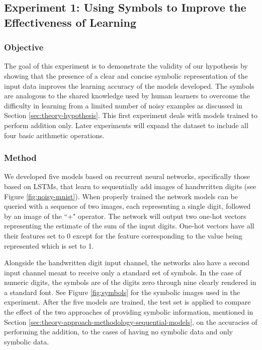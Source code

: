 \subsection{Experiment 1: Using Symbols to Improve the Effectiveness of Learning} \label{sec:experiment-1}

\subsubsection{Objective}

The goal of this experiment is to demonstrate the validity of our hypothesis by showing that the presence of a clear and concise symbolic representation of the input data improves the learning accuracy of the models developed. The symbols are analogous to the shared knowledge used by human learners to overcome the difficulty in learning from a limited number of noisy examples as discussed in Section \ref{sec:theory-hypothesis}. This first experiment deals with models trained to perform addition only. Later experiments will expand the dataset to include all four basic arithmetic operations.

\subsubsection{Method}

We developed five models based on recurrent neural networks, specifically those based on LSTMs, that learn to sequentially add images of handwritten digits (see Figure \ref{fig:noisy-mnist}). When properly trained the network models can be queried with a sequence of two images, each representing a single digit, followed by an image of the ``+" operator.  The network will output two one-hot vectors representing the estimate of the sum of the input digits. One-hot vectors have all their features set to 0 except for the feature corresponding to the value being represented which is set to 1.

Alongside the handwritten digit input channel, the networks also have a second input channel meant to receive only a standard set of symbols. In the case of numeric digits, the symbols are of the digits zero through nine clearly rendered in a standard font. See Figure \ref{fig:symbols} for the symbolic images used in the experiment. After the five models are trained, the test set is applied to compare the effect of the two approaches of providing symbolic information, mentioned in Section \ref{sec:theory-approach-methodology-sequential-models}, on the accuracies of performing the addition, to the cases of having no symbolic data and only symbolic data.

